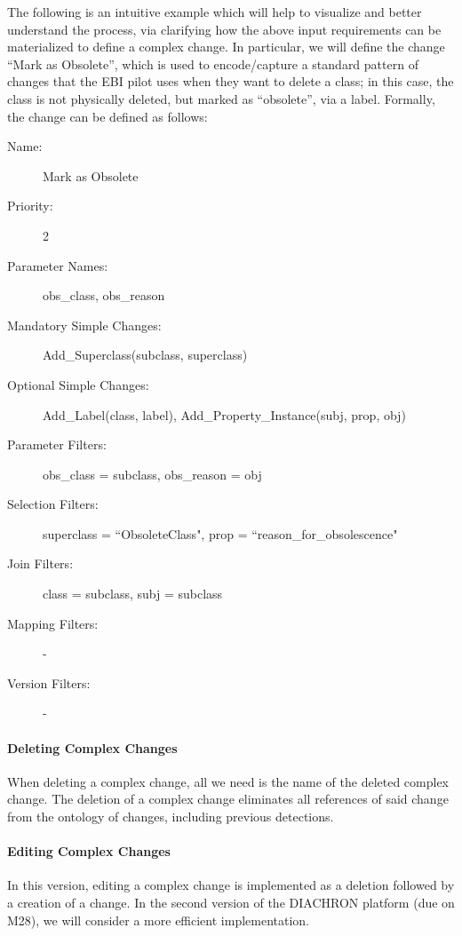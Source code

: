 \begin{example}
The following is an intuitive example which will help to visualize and better understand the process, via clarifying how the above input requirements can be materialized to define a complex change.
In particular, we will define the change ``Mark as Obsolete'', which is used to encode/capture a standard pattern of changes that the EBI pilot uses when they want to delete a class; in this case, the class is not physically deleted, but marked as ``obsolete'', via a label. Formally, the change can be defined as follows:
\begin{description}
\item [Name:] Mark as Obsolete
\item [Priority:] 2
\item [Parameter Names:] obs\_class, obs\_reason
\item [Mandatory Simple Changes:] Add\_Superclass(subclass, superclass)
\item [Optional Simple Changes:] Add\_Label(class, label), Add\_Property\_Instance(subj, prop, obj)
\item [Parameter Filters:] obs\_class = subclass, obs\_reason = obj
\item [Selection Filters:] superclass = ``ObsoleteClass", prop = ``reason\_for\_obsolescence"
\item [Join Filters:] class = subclass, subj = subclass 
\item [Mapping Filters:] -
\item [Version Filters:] -
\end{description}
\end{example} 

\paragraph{Deleting Complex Changes}
When deleting a complex change, all we need is the name of the deleted complex change. The deletion of a complex change eliminates all references of said change from the ontology of changes, including previous detections.

\paragraph{Editing Complex Changes}
In this version, editing a complex change is implemented as a deletion followed by a creation of a change. In the second version of the DIACHRON platform (due on M28), we will consider a more efficient implementation.

